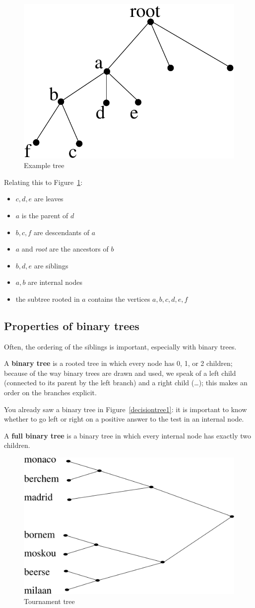 \begin{figure}[ht]
	\centering
	\includegraphics[width=0.25\linewidth,keepaspectratio]{boom1eng}
	\caption{Example tree \label{boom1}}
\end{figure}
\newpage
Relating this to Figure~\ref{boom1}:

\begin{itemize}
	\item $c,d,e$ are leaves
	\item $a$ is the parent of $d$
	\item $b,c,f$ are descendants of $a$
	\item $a$ and {\em root} are the ancestors of $b$
	\item $b,d,e$ are siblings
	\item $a,b$ are internal nodes
	\item the subtree rooted in $a$ contains the vertices $a,b,c,d,e,f$
\end{itemize}

\subsection{Properties of binary trees}
Often, the ordering of the siblings is important, especially with binary
trees.

 \begin{definition}
\textup{A \textbf{binary tree} is a rooted tree in which every node
has 0, 1, or 2 children; because of the way binary trees are drawn and
used, we speak of a left child (connected to its parent by the left
branch) and a right child (\ldots); this makes an order on the branches
explicit.  }
\end{definition}

You already saw a binary tree in Figure~\ref{decisiontree1}: it is
important to know whether to go left or right on a positive answer to
the test in an internal node.

 \begin{definition}
\textup{A \textbf{full binary tree} is a binary tree
in which every internal node has exactly two children.  }
\end{definition}

\begin{figure}[ht]
	\centering
	\includegraphics[width=0.44\linewidth,keepaspectratio]{tornooi1}
	\caption{Tournament tree \label{tornooi1}}
\end{figure}


